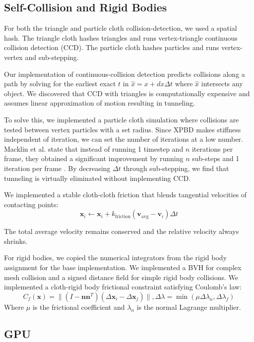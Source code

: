 \documentclass{article}
\begin{document}
\subsection{Self-Collision and Rigid Bodies}
For both the triangle and particle cloth collision-detection, we used a spatial hash. The triangle cloth hashes triangles and runs vertex-triangle continuous collision detection (CCD). The particle cloth hashes particles and runs vertex-vertex and sub-stepping. 

Our implementation of continuous-collision detection predicts collisions along a path by solving for the earliest exact $t$ in $\hat x = x+dx\Delta t$ where $\hat x$ intersects any object. We discovered that CCD with triangles is computationally expensive and assumes linear approximation of motion resulting in tunneling. 

To solve this, we implemented a particle cloth simulation where collisions are tested between vertex particles with a set radius. Since XPBD makes stiffness independent of iteration, we can set the number of iterations at a low number. Macklin et al. state that instead of running 1 timestep and $n$ iterations per frame, they obtained a significant improvement by running $n$ sub-steps and 1 iteration per frame \cite{10.1145/3309486.3340247}. By decreasing $\Delta t$ through sub-stepping, we find that tunneling is virtually eliminated without implementing CCD. 

We implemented a stable cloth-cloth friction that blends tangential velocities of contacting points:
\[\textbf{x}_i \gets \textbf{x}_i + k_{\text{friction}}(\textbf{v}_{\text{avg}} - \textbf{v}_i)\Delta t\]

The total average velocity remains conserved and the relative velocity always shrinks. 

For rigid bodies, we copied the numerical integrators from the rigid body assignment for the base implementation. We implemented a BVH for complex mesh collision and a signed distance field for simple rigid body collisions. We implemented a cloth-rigid body frictional constraint satisfying Coulomb's law: 
\[C_f(\textbf{x}) = \|(I-\textbf{n}\textbf{n}^T)(\Delta \textbf{x}_i - \Delta \textbf{x}_j) \|, \Delta \lambda = \min(\mu \Delta \lambda_n, \Delta \lambda_f)\]
Where $\mu$ is the frictional coefficient and $\lambda_n$ is the normal Lagrange multiplier. 

\subsection{GPU}
\end{document}
